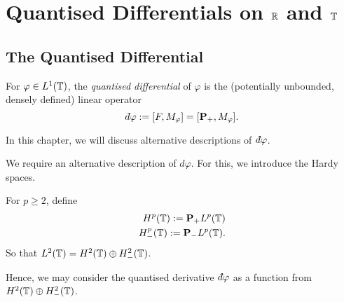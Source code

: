 
\chapter{Quantised Differentials on $\mathbb{R}$ and $\mathbb{T}$} %

\label{Chapter2} %



\section{The Quantised Differential}

\begin{definition}
    For $\varphi \in L^1(\mathbb{T})$, the \emph{quantised differential} of $\varphi$ is the (potentially unbounded, densely defined) linear operator
    \begin{equation*}
        \qd\varphi := [F,M_\varphi] = [\Proj_+,M_\varphi].
    \end{equation*}
\end{definition}
In this chapter, we will discuss alternative descriptions of $\qd \varphi$.

We require an alternative description of $d\varphi$. For this, we introduce the Hardy spaces.
\begin{definition}
    For $p\geq 2$, define
    \begin{align*}
        H^p(\mathbb{T}) := \mathbf{P}_+ L^p(\mathbb{T})\\
        H^p_-(\mathbb{T}) := \mathbf{P}_- L^p(\mathbb{T}).
    \end{align*}
    So that $L^2(\mathbb{T}) = H^2(\mathbb{T})\oplus H^2_-(\mathbb{T})$. 
\end{definition}

Hence, we may consider the quantised derivative $\qd\varphi$ as a function from $H^2(\mathbb{T})\oplus H^2_-(\mathbb{T})$.

